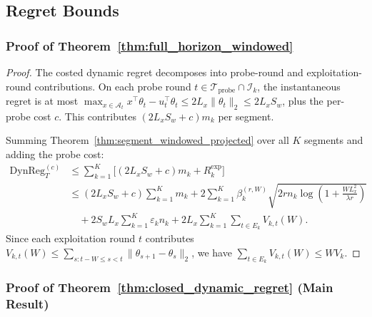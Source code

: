 \documentclass{article}
\newcommand{\cA}{\mathcal{A}}
\newcommand{\cI}{\mathcal{I}}
\newcommand{\cTprobe}{\mathcal{T}_{\mathrm{probe}}}
\newcommand{\DynReg}{\mathrm{DynReg}}
\begin{document}
\subsection{Regret Bounds}

\subsubsection{Proof of Theorem~\ref{thm:full_horizon_windowed}}
\label{proof:full_horizon_windowed}

\begin{proof}
The costed dynamic regret decomposes into probe-round and exploitation-round contributions.
On each probe round $t \in \cTprobe \cap \cI_k$, the instantaneous regret is at most $\max_{x \in \cA_t} x^\top \theta_t - u_t^\top \theta_t \le 2L_x \|\theta_t\|_2 \le 2L_x S_w$, plus the per-probe cost $c$.
This contributes $(2L_x S_w + c) m_k$ per segment.

Summing Theorem~\ref{thm:segment_windowed_projected} over all $K$ segments and adding the probe cost:
\[
\begin{aligned}
\DynReg_T^{(c)} &\le \sum_{k=1}^K \bigl[(2L_xS_w+c)m_k + R_k^{\mathrm{exp}}\bigr] \\
&\le (2L_xS_w+c)\sum_{k=1}^K m_k + 2\sum_{k=1}^K \beta_k^{(r,W)} \sqrt{2r n_k \log\!\left(1+\frac{W L_x^2}{\lambda r}\right)} \\
&\quad + 2S_wL_x \sum_{k=1}^K \varepsilon_k n_k + 2L_x \sum_{k=1}^K \sum_{t \in E_k} V_{k,t}(W).
\end{aligned}
\]
Since each exploitation round $t$ contributes $V_{k,t}(W) \le \sum_{s: t-W \le s < t} \|\theta_{s+1} - \theta_s\|_2$, we have $\sum_{t \in E_k} V_{k,t}(W) \le W V_k$.
\end{proof}

\subsubsection{Proof of Theorem~\ref{thm:closed_dynamic_regret} (Main Result)}
\label{proof:closed_dynamic_regret}
\end{document}
